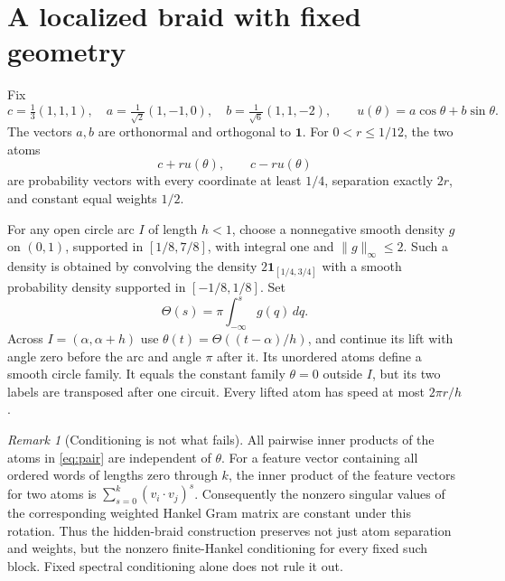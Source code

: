 \documentclass[11pt]{article}
\theoremstyle{remark}\newtheorem{remark}[theorem]{Remark}
\newcommand{\one}{\mathbf 1}
\begin{document}
\section{A localized braid with fixed geometry}
Fix
\[
 c=\tfrac13(1,1,1),\quad
 a=\tfrac1{\sqrt2}(1,-1,0),\quad
 b=\tfrac1{\sqrt6}(1,1,-2),\qquad
 u(\theta)=a\cos\theta+b\sin\theta.
\]
The vectors $a,b$ are orthonormal and orthogonal to $\one$. For $0<r\leq1/12$, the two atoms
\begin{equation}\label{eq:pair}
 c+r u(\theta),\qquad c-r u(\theta)
\end{equation}
are probability vectors with every coordinate at least $1/4$, separation exactly $2r$, and constant equal weights $1/2$.

For any open circle arc $I$ of length $h<1$, choose a nonnegative smooth density $g$ on $(0,1)$, supported in $[1/8,7/8]$, with integral one and $\|g\|_\infty\leq2$. Such a density is obtained by convolving the density $2\mathbf1_{[1/4,3/4]}$ with a smooth probability density supported in $[-1/8,1/8]$. Set
\[
 \Theta(s)=\pi\int_{-\infty}^{s}g(q)\,dq.
\]
Across $I=(\alpha,\alpha+h)$ use $\theta(t)=\Theta((t-\alpha)/h)$, and continue its lift with angle zero before the arc and angle $\pi$ after it. Its unordered atoms define a smooth circle family. It equals the constant family $\theta=0$ outside $I$, but its two labels are transposed after one circuit. Every lifted atom has speed at most $2\pi r/h$.

\begin{remark}[Conditioning is not what fails]
All pairwise inner products of the atoms in \eqref{eq:pair} are independent of $\theta$. For a feature vector containing all ordered words of lengths zero through $k$, the inner product of the feature vectors for two atoms is $\sum_{s=0}^k(v_i\cdot v_j)^s$. Consequently the nonzero singular values of the corresponding weighted Hankel Gram matrix are constant under this rotation. Thus the hidden-braid construction preserves not just atom separation and weights, but the nonzero finite-Hankel conditioning for every fixed such block. Fixed spectral conditioning alone does not rule it out.
\end{remark}
\end{document}
